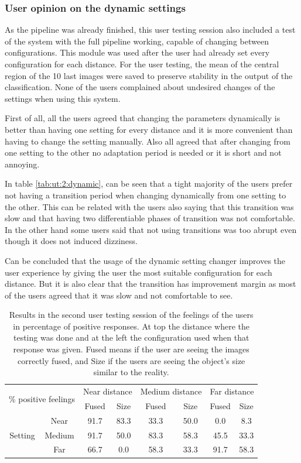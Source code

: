 \documentclass[10pt,a4paper,twocolumn,twoside]{article}
\begin{document}
	\subsubsection{User opinion on the dynamic settings}
	As the pipeline was already finished, this user testing session also included a test of the system with the full pipeline working, capable of changing between configurations. This module was used after the user had already set every configuration for each distance.  
	For the user testing, the mean of the central region of the 10 last images were saved to preserve stability in the output of the classification. None of the users complained about undesired changes of the settings when using this system.  
	
	First of all, all the users agreed that changing the parameters dynamically is better than having one setting for every distance and it is more convenient than having to change the setting manually. Also all agreed that after changing from one setting to the other no adaptation period is needed or it is short and not annoying.  
	
	In table \ref{tab:ut:2:dynamic}, can be seen that a tight majority of the users prefer not having a transition period when changing dynamically from one setting to the other. This can be related with the users also saying that this transition was slow and that having two differentiable phases of transition was not comfortable. In the other hand some users said that not using transitions was too abrupt even though it does not induced dizziness. 
	
	Can be concluded that the usage of the dynamic setting changer improves the user experience by giving the user the most suitable configuration for each distance. But it is also clear that the transition has improvement margin as most of the users agreed that it was slow and not comfortable to see.
	
	\begin{table}
		\centering
		\begin{tabular}{@{}cccccccc@{}}
			\toprule
			\multicolumn{2}{l}{\multirow{2}{*}{\% positive feelings}} & \multicolumn{2}{c}{Near distance} & \multicolumn{2}{c}{Medium distance} & \multicolumn{2}{c}{Far distance} \\
			\multicolumn{2}{l}{} & Fused & Size & Fused & Size & Fused & Size \\ \midrule
			\multirow{3}{*}{Setting} & Near & 91.7 & 83.3 & 33.3 & 50.0 & 0.0 & 8.3 \\
			& Medium & 91.7 & 50.0 & 83.3 & 58.3 & 45.5 & 33.3 \\
			& Far & 66.7 & 0.0 & 58.3 & 33.3 & 91.7 & 58.3 \\ \bottomrule
		\end{tabular}
		\caption{Results in the second user testing session of the feelings of the users in percentage of positive responses. At top the distance where the testing was done and at the left the configuration used when that response was given. Fused means if the user are seeing the images correctly fused, and Size if the users are seeing the object's size similar to the reality.}
		\label{tab:ut:2:feelings}
	\end{table}
\end{document}
